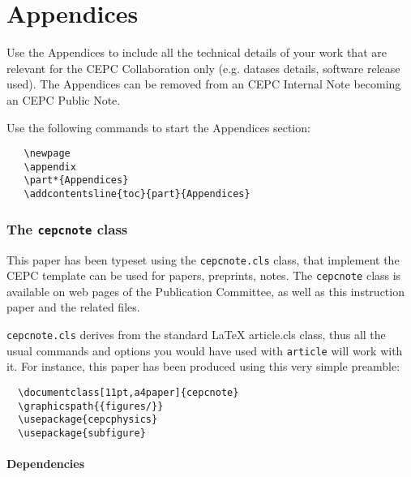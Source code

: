 \documentclass[11pt,a4paper]{cepcnote}
\begin{document}




\newpage
\appendix
\part*{Appendices}

Use the Appendices to include all the technical details of your work
that are relevant for the CEPC Collaboration only (e.g. datases
details, software release used). The Appendices can be removed from
an CEPC Internal Note becoming an CEPC Public Note.

Use the following commands to start the Appendices section:
\begin{verbatim}
   \newpage
   \appendix
   \part*{Appendices}
   \addcontentsline{toc}{part}{Appendices}
\end{verbatim}

\section{The {\tt cepcnote} class}
\label{app:CepcNoteCls}

This paper has been typeset using the {\tt cepcnote.cls} class, that
implement the CEPC template can be used for papers, preprints,
notes. The {\tt cepcnote} class is available on web pages of the
Publication Committee, as well as this instruction paper and the
related files.

{\tt cepcnote.cls} derives from the standard \LaTeX{} {article.cls}
class, thus all the usual commands and options you would have used
with {\tt article} will work with it. For instance, this paper has
been produced using this very simple preamble:

\begin{verbatim}
  \documentclass[11pt,a4paper]{cepcnote}
  \graphicspath{{figures/}}
  \usepackage{cepcphysics}
  \usepackage{subfigure}
\end{verbatim}

\subsection{Dependencies}
\end{document}
